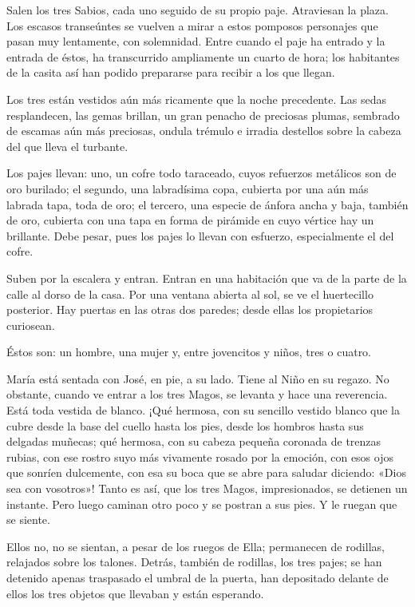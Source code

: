 \documentclass[12pt]{book} %
\begin{document}
Salen los tres Sabios, cada uno seguido de su propio paje. Atraviesan la plaza. Los escasos transeúntes se vuelven a mirar a estos pomposos personajes que pasan muy lentamente, con solemnidad. Entre cuando el paje ha entrado y la entrada de éstos, ha transcurrido ampliamente un cuarto de hora; los habitantes de la casita así han podido prepararse para recibir a los que llegan. 

Los tres están vestidos aún más ricamente que la noche precedente. Las sedas resplandecen, las gemas brillan, un gran penacho de preciosas plumas, sembrado de escamas aún más preciosas, ondula trémulo e irradia destellos sobre la cabeza del que lleva el turbante. 

Los pajes llevan: uno, un cofre todo taraceado, cuyos refuerzos metálicos son de oro burilado; el segundo, una labradísima copa, cubierta por una aún más labrada tapa, toda de oro; el tercero, una especie de ánfora ancha y baja, también de oro, cubierta con una tapa en forma de pirámide en cuyo vértice hay un brillante. Debe pesar, pues los pajes lo llevan con esfuerzo, especialmente el del cofre. 

Suben por la escalera y entran. Entran en una habitación que va de la parte de la calle al dorso de la casa. Por una ventana abierta al sol, se ve el huertecillo posterior. Hay puertas en las otras dos paredes; desde ellas los propietarios curiosean. 

Éstos son: un hombre, una mujer y, entre jovencitos y niños, tres o cuatro. 

María está sentada con José, en pie, a su lado. Tiene al Niño en su regazo. No obstante, cuando ve entrar a los tres Magos, se levanta y hace una reverencia. Está toda vestida de blanco. ¡Qué hermosa, con su sencillo vestido blanco que la cubre desde la base del cuello hasta los pies, desde los hombros hasta sus delgadas muñecas; qué hermosa, con su cabeza pequeña coronada de trenzas rubias, con ese rostro suyo más vivamente rosado por la emoción, con esos ojos que sonríen dulcemente, con esa su boca que se abre para saludar diciendo: «Dios sea con vosotros»! Tanto es así, que los tres Magos, impresionados, se detienen un instante. Pero luego caminan otro poco y se postran a sus pies. Y le ruegan que se siente. 

Ellos no, no se sientan, a pesar de los ruegos de Ella; permanecen de rodillas, relajados sobre los talones. Detrás, también de rodillas, los tres pajes; se han detenido apenas traspasado el umbral de la puerta, han depositado delante de ellos los tres objetos que llevaban y están esperando. 
\end{document}
